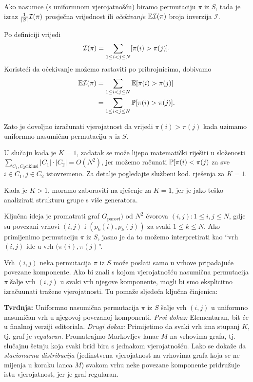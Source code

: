Ako nasumce (s uniformnom vjerojatnošću) biramo permutaciju $\pi$ iz
$S$, tada je izraz $\frac{1}{|S|} \mathcal I(\pi)$ prosječna vrijednost
ili \textit{očekivanje} $\mathbb E\mathcal{I}(\pi)$ broja inverzija $\mathcal{I}$.

Po definiciji vrijedi
\begin{equation*}
  \mathcal I(\pi) = \sum\limits_{1 \le i < j \le N} [ \pi(i) > \pi(j) ]. 
\end{equation*}
Koristeći da očekivanje možemo rastaviti po pribrojnicima, dobivamo
\begin{align*}
  \mathbb E \mathcal I(\pi)  &= \sum\limits_{1 \le i < j \le N} \mathbb E [ \pi(i) > \pi(j) ] \\
                &= \sum\limits_{1 \le i < j \le N} \mathbb P [ \pi(i) > \pi(j) ]. 
\end{align*}

Zato je dovoljno izračunati vjerojatnost da vrijedi $\pi(i) > \pi(j)$
kada uzimamo uniformno nasumičnu permutaciju $\pi$ iz $S$.

U slučaju kada je $K = 1$, zadatak se može lijepo matematički riješiti
u složenosti $\sum_{C_1, C_2 \text{ciklusi}} |C_1| \cdot |C_2| 
= O(N^2)$, jer možemo računati $\mathbb P[\pi(i) < \pi(j)$ za
sve $i \in C_1, j \in C_2$ istovremeno. Za detalje pogledajte službeni kod.
rješenja za $K = 1$.

Kada je $K > 1$, moramo zaboraviti na rješenje za $K = 1$, jer je jako
teško analizirati strukturu grupe s više generatora.

Ključna ideja je promatrati graf $G_{\text{parovi}})$ 
od $N^2$ čvorova $(i, j) : 1 \le i, j \le N$,
gdje su povezani vrhovi $(i, j)$ i $(p_k(i), p_k(j))$ za svaki $1 \le k \le N$.
Ako primijenimo permutaciju $\pi$ iz $S$, jasno je da to možemo
interpretirati kao ``vrh $(i, j)$ ide u vrh $(\pi(i), \pi(j)$''.

Vrh $(i, j)$ neka permutacija $\pi$ iz $S$ 
može poslati samo u vrhove pripadajuće povezane komponente.
Ako bi znali s kojom vjerojatnošću nasumična permutacija $\pi$
šalje vrh $(i, j)$ u svaki vrh njegove komponente, 
mogli bi smo eksplicitno izračuunati tražene vjerojatnosti.
Tu pomaže sljedeća ključna činjenica:

\textbf{Tvrdnja:} Uniformno nasumična permutacija $\pi$ iz $S$ šalje
vrh $(i, j)$ u uniformno nasumičan vrh u njegovoj povezanoj komponenti.
\textit{Prvi dokaz:} Elementaran, bit će u finalnoj verziji editoriala.
\textit{Drugi dokaz:} Primijetimo da svaki vrh ima stupanj $K$,
tj. graf je \textit{regularan}.
Promatrajmo Markovljev lanac $M$ na vrhovima grafa,
tj. slučajnu šetnju koja svaki brid bira s jednakom vjerojatnošću.
Lako se dokaže da \textit{stacionarna distribucija} (jedinstvena
vjerojatnost na vrhovima grafa koja se ne mijenja u koraku lanca $M$)
svakom vrhu neke povezane komponente pridružuje istu vjerojatnost,
jer je graf regularan. 

